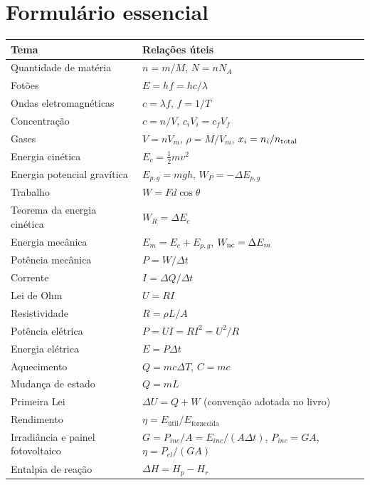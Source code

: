 \documentclass[11pt,a4paper,oneside]{book}
\begin{document}
\backmatter
\chapter*{Formulário essencial}

\begin{longtable}{p{}p{}}
\toprule
Tema & Relações úteis \\
\midrule
Quantidade de matéria & $n=m/M$, $N=nN_A$ \\
Fotões & $E=hf=hc/\lambda$ \\
Ondas eletromagnéticas & $c=\lambda f$, $f=1/T$ \\
Concentração & $c=n/V$, $c_iV_i=c_fV_f$ \\
Gases & $V=nV_m$, $\rho=M/V_m$, $x_i=n_i/n_{\rm total}$ \\
Energia cinética & $E_c=\frac12mv^2$ \\
Energia potencial gravítica & $E_{p,g}=mgh$, $W_P=-\Delta E_{p,g}$ \\
Trabalho & $W=Fd\cos\theta$ \\
Teorema da energia cinética & $W_R=\Delta E_c$ \\
Energia mecânica & $E_m=E_c+E_{p,g}$, $W_{\rm nc}=\Delta E_m$ \\
Potência mecânica & $P=W/\Delta t$ \\
Corrente & $I=\Delta Q/\Delta t$ \\
Lei de Ohm & $U=RI$ \\
Resistividade & $R=\rho L/A$ \\
Potência elétrica & $P=UI=RI^2=U^2/R$ \\
Energia elétrica & $E=P\Delta t$ \\
Aquecimento & $Q=mc\Delta T$, $C=mc$ \\
Mudança de estado & $Q=mL$ \\
Primeira Lei & $\Delta U=Q+W$ (convenção adotada no livro) \\
Rendimento & $\eta=E_{\text{útil}}/E_{\text{fornecida}}$ \\
Irradiância e painel fotovoltaico & $G=P_{inc}/A=E_{inc}/(A\Delta t)$, $P_{inc}=GA$, $\eta=P_{el}/(GA)$ \\
Entalpia de reação & $\Delta H=H_p-H_r$ \\
\bottomrule
\end{longtable}
\end{document}
